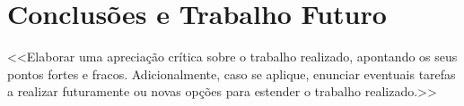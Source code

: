 \documentclass[11pt,a4paper]{report}
\begin{document}
\chapter{Conclusões e Trabalho Futuro}

<<Elaborar uma apreciação crítica sobre o trabalho realizado, apontando os seus pontos fortes e fracos. Adicionalmente, caso se aplique, enunciar eventuais tarefas a realizar futuramente ou novas opções para estender o trabalho realizado.>>




\appendix
\end{document}

